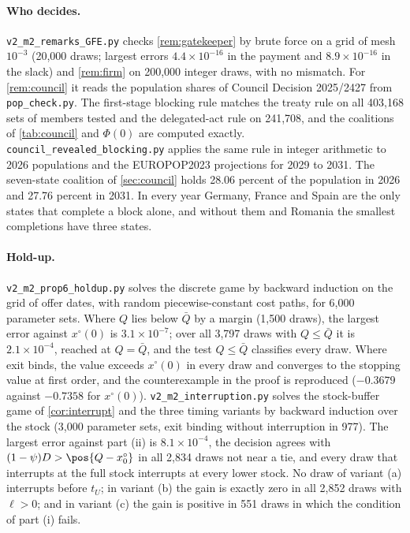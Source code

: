 \paragraph{Who decides.} \texttt{v2\_m2\_remarks\_GFE.py} checks \cref{rem:gatekeeper} by brute force on a grid of mesh $10^{-3}$ (20,000 draws; largest errors $4.4\times10^{-16}$ in the payment and $8.9\times10^{-16}$ in the slack) and \cref{rem:firm} on 200,000 integer draws, with no mismatch. For \cref{rem:council} it reads the population shares of Council Decision 2025/2427 \citep{council2025population} from \texttt{pop\_check.py}. The first-stage blocking rule matches the treaty rule on all 403,168 sets of members tested and the delegated-act rule on 241,708, and the coalitions of \cref{tab:council} and $\Phi(0)$ are computed exactly. \texttt{council\_revealed\_blocking.py} applies the same rule in integer arithmetic to 2026 populations and the EUROPOP2023 projections for 2029 to 2031. The seven-state coalition of \cref{sec:council} holds 28.06 percent of the population in 2026 and 27.76 percent in 2031. In every year Germany, France and Spain are the only states that complete a block alone, and without them and Romania the smallest completions have three states.

\paragraph{Hold-up.} \texttt{v2\_m2\_prop6\_holdup.py} solves the discrete game by backward induction on the grid of offer dates, with random piecewise-constant cost paths, for 6,000 parameter sets. Where $Q$ lies below $\bar Q$ by a margin (1,500 draws), the largest error against $x^\circ(0)$ is $3.1\times10^{-7}$; over all 3,797 draws with $Q\le\bar Q$ it is $2.1\times10^{-4}$, reached at $Q=\bar Q$, and the test $Q\le\bar Q$ classifies every draw. Where exit binds, the value exceeds $x^\circ(0)$ in every draw and converges to the stopping value at first order, and the counterexample in the proof is reproduced ($-0.3679$ against $-0.7358$ for $x^\circ(0)$). \texttt{v2\_m2\_interruption.py} solves the stock-buffer game of \cref{cor:interrupt} and the three timing variants by backward induction over the stock (3,000 parameter sets, exit binding without interruption in 977). The largest error against part (ii) is $8.1\times10^{-4}$, the decision agrees with $(1-\psi)D>\pos{Q-x^\circ_0}$ in all 2,834 draws not near a tie, and every draw that interrupts at the full stock interrupts at every lower stock. No draw of variant (a) interrupts before $t_U$; in variant (b) the gain is exactly zero in all 2,852 draws with $\ell>0$; and in variant (c) the gain is positive in 551 draws in which the condition of part (i) fails.

